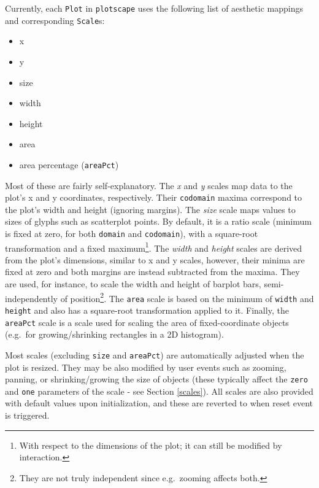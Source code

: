 \documentclass[
  openany]{book}
\providecommand{\tightlist}{%
  \setlength{\itemsep}{0pt}\setlength{\parskip}{0pt}}
\theoremstyle{definition}
\theoremstyle{definition}
\theoremstyle{definition}
\theoremstyle{definition}
\theoremstyle{remark}
\begin{document}
Currently, each \texttt{Plot} in \texttt{plotscape} uses the following list of aesthetic mappings and corresponding \texttt{Scale}s:

\begin{itemize}
\tightlist
\item
  x
\item
  y
\item
  size
\item
  width
\item
  height
\item
  area
\item
  area percentage (\texttt{areaPct})
\end{itemize}

Most of these are fairly self-explanatory. The \emph{x} and \emph{y} scales map data to the plot's x and y coordinates, respectively. Their \texttt{codomain} maxima correspond to the plot's width and height (ignoring margins). The \emph{size} scale maps values to sizes of glyphs such as scatterplot points. By default, it is a ratio scale (minimum is fixed at zero, for both \texttt{domain} and \texttt{codomain}), with a square-root transformation and a fixed maximum\footnote{With respect to the dimensions of the plot; it can still be modified by interaction.}. The \emph{width} and \emph{height} scales are derived from the plot's dimensions, similar to x and y scales, however, their minima are fixed at zero and both margins are instead subtracted from the maxima. They are used, for instance, to scale the width and height of barplot bars, semi-independently of position\footnote{They are not truly independent since e.g.~zooming affects both.}. The \texttt{area} scale is based on the minimum of \texttt{width} and \texttt{height} and also has a square-root transformation applied to it. Finally, the \texttt{areaPct} scale is a scale used for scaling the area of fixed-coordinate objects (e.g.~for growing/shrinking rectangles in a 2D histogram).

Most scales (excluding \texttt{size} and \texttt{areaPct}) are automatically adjusted when the plot is resized. They may be also modified by user events such as zooming, panning, or shrinking/growing the size of objects (these typically affect the \texttt{zero} and \texttt{one} parameters of the scale - see Section \ref{scales}). All scales are also provided with default values upon initialization, and these are reverted to when reset event is triggered.
\end{document}
